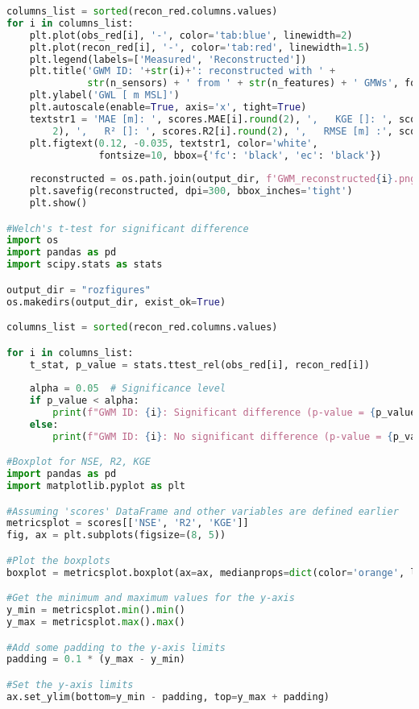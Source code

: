 \begin{lstlisting}[language=Python]
columns_list = sorted(recon_red.columns.values)
for i in columns_list:
    plt.plot(obs_red[i], '-', color='tab:blue', linewidth=2)
    plt.plot(recon_red[i], '-', color='tab:red', linewidth=1.5)
    plt.legend(labels=['Measured', 'Reconstructed'])
    plt.title('GWM ID: '+str(i)+': reconstructed with ' +
              str(n_sensors) + ' from ' + str(n_features) + ' GMWs', fontsize=12)
    plt.ylabel('GWL [ m MSL]')
    plt.autoscale(enable=True, axis='x', tight=True)
    textstr1 = 'MAE [m]: ', scores.MAE[i].round(2), ',   KGE []: ', scores.KGE[i].round(2), ',   NSE []: ', scores.NSE[i].round(
        2), ',   R² []: ', scores.R2[i].round(2), ',   RMSE [m] :', scores.RMSE[i].round(2), ',   rBias [%] :', scores.rBias[i].round(3)
    plt.figtext(0.12, -0.035, textstr1, color='white',
                fontsize=10, bbox={'fc': 'black', 'ec': 'black'})
    
    reconstructed = os.path.join(output_dir, f'GWM_reconstructed{i}.png')
    plt.savefig(reconstructed, dpi=300, bbox_inches='tight')
    plt.show()

#Welch's t-test for significant difference 
import os
import pandas as pd
import scipy.stats as stats

output_dir = "rozfigures"
os.makedirs(output_dir, exist_ok=True)

columns_list = sorted(recon_red.columns.values)

for i in columns_list:
    t_stat, p_value = stats.ttest_rel(obs_red[i], recon_red[i])
    
    alpha = 0.05  # Significance level
    if p_value < alpha:
        print(f"GWM ID: {i}: Significant difference (p-value = {p_value:.3f})")
    else:
        print(f"GWM ID: {i}: No significant difference (p-value = {p_value:.3f})")

#Boxplot for NSE, R2, KGE
import pandas as pd 
import matplotlib.pyplot as plt 

#Assuming 'scores' DataFrame and other variables are defined earlier
metricsplot = scores[['NSE', 'R2', 'KGE']]
fig, ax = plt.subplots(figsize=(8, 5))

#Plot the boxplots
boxplot = metricsplot.boxplot(ax=ax, medianprops=dict(color='orange', linewidth=2))

#Get the minimum and maximum values for the y-axis
y_min = metricsplot.min().min()
y_max = metricsplot.max().max()

#Add some padding to the y-axis limits
padding = 0.1 * (y_max - y_min)

#Set the y-axis limits
ax.set_ylim(bottom=y_min - padding, top=y_max + padding)


\end{lstlisting}
